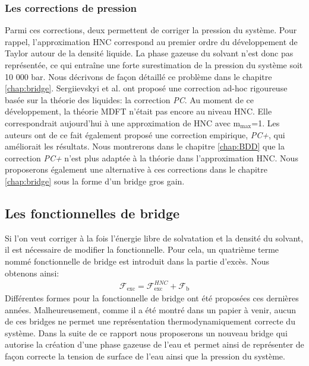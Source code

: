 \subsubsection{Les corrections de pression}
Parmi ces corrections, deux permettent de corriger la pression du système. Pour rappel, l'approximation HNC correspond au premier ordre du développement de Taylor autour de la densité liquide. La phase gazeuse du solvant n'est donc pas représentée, ce qui entraîne une forte surestimation de la pression du système soit 10 000 bar. Nous décrivons de façon détaillé ce problème dans le chapitre \ref{chap:bridge}. Sergiievskyi et al. \cite{sergiievskyi_solvation_2015,sergiievskyi_pressure_2015} ont proposé une correction ad-hoc rigoureuse basée sur la théorie des liquides: la correction \textit{PC}. Au moment de ce développement, la théorie MDFT n'était pas encore au niveau HNC. Elle correspondrait aujourd'hui à une approximation de HNC avec $\mathrm{m}_\mathrm{max}$=1. Les auteurs ont de ce fait également proposé une correction empirique, \textit{PC+}, qui améliorait les résultats\cite{misin_salting-out_2016, misin_hydration_2016, misin_communication:_2015}. Nous montrerons dans le chapitre \ref{chap:BDD} que la correction \textit{PC+} n'est plus adaptée à la théorie dans l'approximation HNC. Nous proposerons également une alternative à ces corrections dans le chapitre \ref{chap:bridge} sous la forme d'un bridge gros gain.




\subsection{Les fonctionnelles de bridge}
Si l'on veut corriger à la fois l'énergie libre de solvatation et la densité du solvant, il est nécessaire de modifier la fonctionnelle. Pour cela, un quatrième terme nommé fonctionnelle de bridge est introduit dans la partie d'excès. Nous obtenons ainsi:
\begin{eqnarray}
\mathcal{F}_\mathrm{exc} = \mathcal{F}_\mathrm{exc}^{HNC} + \mathcal{F}_\mathrm{b}
\end{eqnarray}
Différentes formes pour la fonctionnelle de bridge ont été proposées ces dernières années\cite{levesque_scalar_2012,jeanmairet_molecular_2013,jeanmairet_molecular_2015}. Malheureusement, comme il a été montré dans un papier à venir, aucun de ces bridges ne permet une représentation thermodynamiquement correcte du système. Dans la suite de ce rapport nous proposerons un nouveau bridge qui autorise la création d'une phase gazeuse de l'eau et permet ainsi de représenter de façon correcte la tension de surface de l'eau ainsi que la pression du système.



